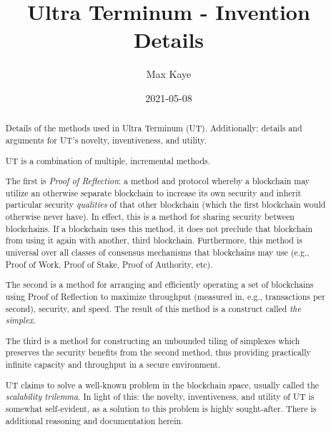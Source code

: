 \documentclass[a4paper,]{article}
\title{Ultra Terminum - Invention Details}
\author{Max Kaye}
\date{2021-05-08}
\begin{document}
\maketitle

\begin{abstract}
    Details of the methods used in Ultra Terminum (UT).
    Additionally: details and arguments for UT's novelty, inventiveness, and utility.

    UT is a combination of multiple, incremental methods.

    The first is \emph{Proof of Reflection}: a method and protocol whereby
    a blockchain may utilize an otherwise separate blockchain to
    increase its own security and inherit particular security \emph{qualities} of that other blockchain
    (which the first blockchain would otherwise never have).
    In effect, this is a method for sharing security between blockchains.
    If a blockchain uses this method, it does not preclude that blockchain from using it again with another, third blockchain.
    Furthermore, this method is universal over all classes of consensus mechanisms that
    blockchains may use (e.g., Proof of Work, Proof of Stake, Proof of Authority, etc).

    The second is a method for arranging and efficiently operating a set of blockchains using Proof of Reflection to maximize throughput (measured in, e.g., transactions per second), security, and speed.
    The result of this method is a construct called \emph{the simplex}.

    The third is a method for constructing an unbounded tiling
    of simplexes which preserves the security benefits from the second method,
    thus providing practically infinite capacity and throughput in a secure environment.

    UT claims to solve a well-known problem in the blockchain space, usually called the \emph{scalability trilemma}.
    In light of this: the novelty, inventiveness, and utility of UT is somewhat self-evident, as a solution to this problem is highly sought-after.
    There is additional reasoning and documentation herein.
\end{abstract}

{
\setcounter{tocdepth}{1}
\tableofcontents
}
\end{document}
